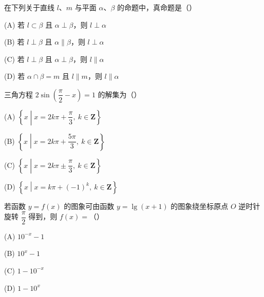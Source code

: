 \begin{question}
在下列关于直线 $l$、$m$ 与平面 $\alpha$、$\beta$ 的命题中，真命题是（\qquad）

(A) 若 $l \subset \beta$ 且 $\alpha \perp \beta$，则 $l \perp \alpha$

(B) 若 $l \perp \beta$ 且 $\alpha \parallel \beta$，则 $l \perp \alpha$

(C) 若 $l \perp \beta$ 且 $\alpha \perp \beta$，则 $l \parallel \alpha$

(D) 若 $\alpha \cap \beta = m$ 且 $l \parallel m$，则 $l \parallel \alpha$

\end{question}
\begin{question}
三角方程 $2\sin\left(\dfrac{\pi}{2} - x\right) = 1$ 的解集为（\qquad）

(A) $\left\{x \mathrel{}\middle|\mathrel{} x = 2k\pi + \dfrac{\pi}{3},\ k \in \mathbf{Z}\right\}$

(B) $\left\{x \mathrel{}\middle|\mathrel{} x = 2k\pi + \dfrac{5\pi}{3},\ k \in \mathbf{Z}\right\}$

(C) $\left\{x \mathrel{}\middle|\mathrel{} x = 2k\pi \pm \dfrac{\pi}{3},\ k \in \mathbf{Z}\right\}$

(D) $\left\{x \mathrel{}\middle|\mathrel{} x = k\pi + (-1)^k,\ k \in \mathbf{Z}\right\}$

\end{question}
\begin{question}
若函数 $y = f(x)$ 的图象可由函数 $y = \lg(x + 1)$ 的图象绕坐标原点 $O$ 逆时针旋转 $\dfrac{\pi}{2}$ 得到，则 $f(x) = $（\qquad）

(A) $10^{-x} - 1$

(B) $10^x - 1$

(C) $1 - 10^{-x}$

(D) $1 - 10^x$

\end{question}
